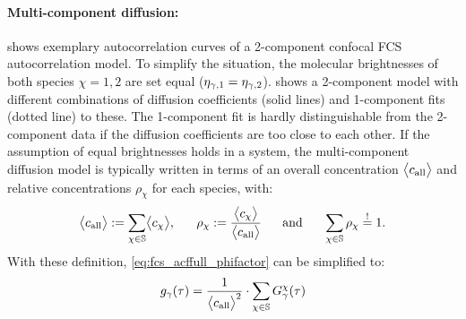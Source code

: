 \paragraph{Multi-component diffusion:}  shows exemplary autocorrelation curves of a 2-component confocal FCS autocorrelation model. To simplify the situation, the molecular brightnesses of both species $\chi=1,2$ are set equal ($\eta_{\gamma,1}=\eta_{\gamma,2}$).  shows a 2-component model with different combinations of diffusion coefficients (solid lines) and 1-component fits (dotted line) to these. The 1-component fit is hardly distinguishable from the 2-component data if the diffusion coefficients are too close to each other. %
If the assumption of equal brightnesses holds in a system, the multi-component diffusion model is typically written in terms of an overall concentration $\bigl\langle c_{\text{all}}\bigr\rangle$ and relative concentrations $\rho_\chi$ for each species, with:
\begin{equation}\label{eq:fcs_multicomp_fractions}
    \smean{c_\txt{all}}:=\sum\limits_{\chi\in\bbS}\smean{c_\chi},\ \ \ \ \ \rho_\chi:=\frac{\smean{c_\chi}}{\smean{c_\txt{all}}}\ \ \ \ \ \text{and}\ \ \ \ \ \sum\limits_{\chi\in\bbS}\rho_\chi\overset{!}{=}1.
\end{equation}
With these definition, \eqref{eq:fcs_acffull_phifactor} can be simplified to:
\begin{equation}\label{eq:fcs_acffull_phifactor_relC}
  g_\gamma(\tau)=\frac{1}{\bigl\langle c_{\text{all}}\bigr\rangle^2}\cdot\sum\limits_{\chi\in\mathbb{S}} G_{\gamma}^{\chi}(\tau) 
\end{equation}


